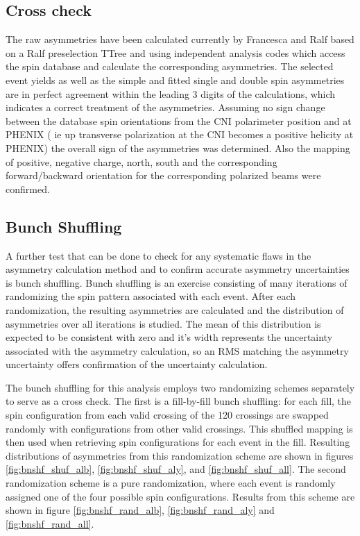 \subsection{Cross check}
The raw asymmetries have been calculated currently by Francesca and Ralf based on a Ralf preselection TTree and using independent analysis codes which access the spin database and calculate the corresponding asymmetries. 
The selected event yields
as well as the simple and fitted single and double spin asymmetries are in perfect agreement within the leading 3 digits of the calculations,
which indicates a correct treatment of the asymmetries. Assuming no sign change between the database spin orientations from the CNI 
polarimeter position and at PHENIX ( ie up transverse polarization at the CNI becomes a positive helicity at PHENIX) the overall sign of the 
asymmetries was determined. 
Also the mapping of positive, negative charge, north, south and the corresponding forward/backward orientation for the corresponding 
polarized beams were confirmed.   

\subsection{Bunch Shuffling}\label{sec:bunch_shuf}
A further test that can be done to check for any systematic flaws in the asymmetry calculation method and to confirm accurate asymmetry
uncertainties is bunch shuffling. Bunch shuffling is an exercise consisting of many iterations of randomizing the spin pattern associated
with each event. After each randomization, the resulting asymmetries are calculated and the distribution of asymmetries over all iterations
is studied. The mean of this distribution is expected to be consistent with zero and it's width represents the uncertainty associated with
the asymmetry calculation, so an RMS matching the asymmetry uncertainty offers confirmation of the uncertainty calculation.

The bunch shuffling for this analysis employs two randomizing schemes separately to serve as a cross check. The first is a fill-by-fill
bunch shuffling: for each fill, the spin configuration from each valid crossing of the 120 crossings are swapped randomly with configurations
from other valid crossings. This shuffled mapping is then used when retrieving spin configurations for each event in the fill. Resulting
distributions of asymmetries from this randomization scheme are shown in figures \ref{fig:bnshf_shuf_alb}, \ref{fig:bnshf_shuf_aly}, 
              and \ref{fig:bnshf_shuf_all}. The second randomization scheme is a
pure randomization, where each event is randomly assigned one of the four possible spin configurations. Results from this scheme are shown in
figure \ref{fig:bnshf_rand_alb}, \ref{fig:bnshf_rand_aly} and \ref{fig:bnshf_rand_all}.

